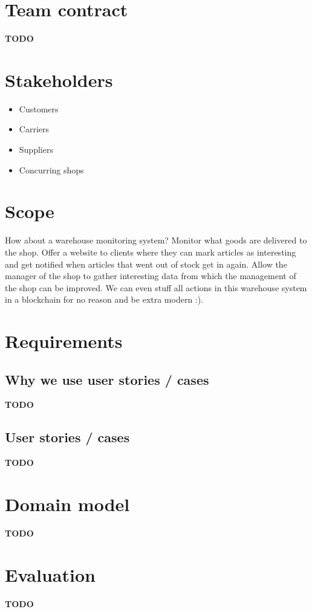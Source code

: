 \documentclass[12pt]{article}
\author{Illkehan Aksu\\
  Tim Gesthuizen\\
  Wouter Leferink}
\date{\today}
\begin{document}
\maketitle

\section{Team contract}

\textbf{TODO}

\section{Stakeholders}

\begin{itemize}
\item Customers
\item Carriers
\item Suppliers
\item Concurring shops
\end{itemize}

\section{Scope}

How about a warehouse monitoring system?
Monitor what goods are delivered to the shop.
Offer a website to clients where they can mark articles as interesting
and get notified when articles that went out of stock get in again.
Allow the manager of the shop to gather interesting data from which
the management of the shop can be improved.
We can even stuff all actions in this warehouse system in a blockchain
for no reason and be extra modern :).

\section{Requirements}

\subsection{Why we use user stories / cases}

\textbf{TODO}

\subsection{User stories / cases}

\textbf{TODO}

\section{Domain model}

\textbf{TODO}

\section{Evaluation}

\textbf{TODO}
\end{document}
